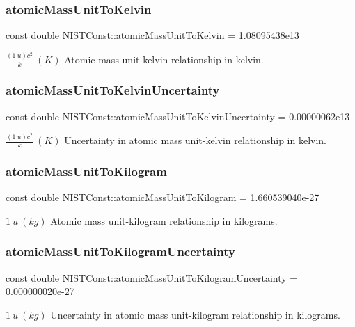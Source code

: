 \subsubsection{\texorpdfstring{atomic\+Mass\+Unit\+To\+Kelvin}{atomicMassUnitToKelvin}}
{\footnotesize\ttfamily const double N\+I\+S\+T\+Const\+::atomic\+Mass\+Unit\+To\+Kelvin = 1.\+08095438e13}

$\frac{(1\ u)c^2}{k} \ (K)$ Atomic mass unit-\/kelvin relationship in kelvin. \mbox{\label{group___atomic_mass_unit_ga124459785d7b4bcbc5a97ed591d859ae}} 
\subsubsection{\texorpdfstring{atomic\+Mass\+Unit\+To\+Kelvin\+Uncertainty}{atomicMassUnitToKelvinUncertainty}}
{\footnotesize\ttfamily const double N\+I\+S\+T\+Const\+::atomic\+Mass\+Unit\+To\+Kelvin\+Uncertainty = 0.\+00000062e13}

$\frac{(1\ u)c^2}{k} \ (K)$ Uncertainty in atomic mass unit-\/kelvin relationship in kelvin. \mbox{\label{group___atomic_mass_unit_gafdd40d93803d15e1ff887dc12c49ca99}} 
\subsubsection{\texorpdfstring{atomic\+Mass\+Unit\+To\+Kilogram}{atomicMassUnitToKilogram}}
{\footnotesize\ttfamily const double N\+I\+S\+T\+Const\+::atomic\+Mass\+Unit\+To\+Kilogram = 1.\+660539040e-\/27}

$1\ u\ (kg)$ Atomic mass unit-\/kilogram relationship in kilograms. \mbox{\label{group___atomic_mass_unit_ga8726643b734abfa2cc6c41b98f59f8c2}} 
\subsubsection{\texorpdfstring{atomic\+Mass\+Unit\+To\+Kilogram\+Uncertainty}{atomicMassUnitToKilogramUncertainty}}
{\footnotesize\ttfamily const double N\+I\+S\+T\+Const\+::atomic\+Mass\+Unit\+To\+Kilogram\+Uncertainty = 0.\+000000020e-\/27}

$1\ u\ (kg)$ Uncertainty in atomic mass unit-\/kilogram relationship in kilograms. 